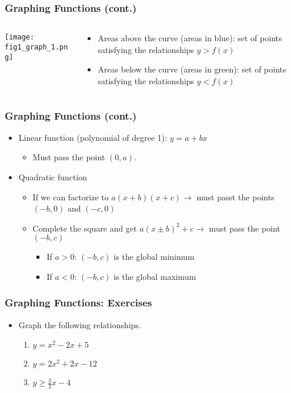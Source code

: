 \documentclass[pdflatex, 12pt]{beamer}
\begin{document}
\begin{frame}
\frametitle{Graphing Functions (cont.)}
\begin{columns}
\begin{column}{0.5\textwidth}
\texttt{[image: fig1\_graph\_1.png]}
\end{column}
\begin{column}{0.5\textwidth}
\begin{itemize}
\item Areas above the curve (areas in blue): set of points satisfying the relationships $y > f(x)$ 
\vspace{0.4cm}
\item Areas below the curve (areas in green): set of points satisfying the relationships $y < f(x)$ 
\end{itemize}
\end{column}
\end{columns}
\end{frame}

\begin{frame}
\frametitle{Graphing Functions (cont.)}
\begin{itemize}
\item Linear function (polynomial of degree 1): $y = a + bx$
 \begin{itemize}
 \item Must pass the point $(0, a)$. 
 \end{itemize}
\vspace{0.4cm}
\item Quadratic function
 \begin{itemize}
 \item If we can factorize to $a(x + b)(x + c) \rightarrow$ must passt the points $(-b, 0)$ and $(-c, 0)$
 \item Complete the square and get $a(x \pm b)^2 + c \rightarrow$ must pass the point $(-b, c)$
  \begin{itemize}
  \item If $a > 0$: $(-b, c)$ is the global minimum
  \item If $a < 0$: $(-b, c)$ is the global maximum
  \end{itemize}
 \end{itemize}
\end{itemize}
\end{frame}

\begin{frame}
\frametitle{Graphing Functions: Exercises}
\begin{itemize}
\item Graph the following relationships.
 \begin{enumerate}
 \item $y = x^2 - 2x + 5$
 \item $y = 2x^2 + 2x - 12$
 \item $y \geq \frac{3}{2}x - 4$
 \end{enumerate}
\end{itemize}
\end{frame}
\end{document}
